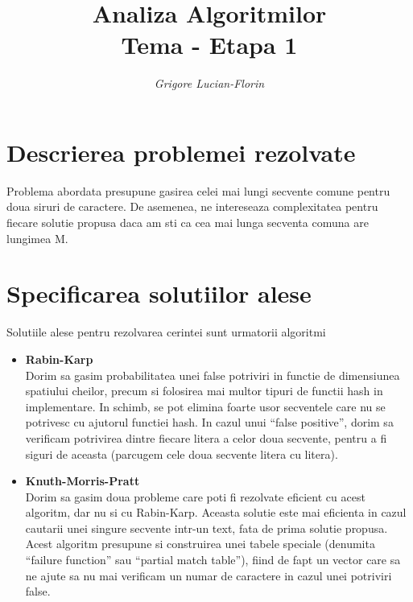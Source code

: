 \documentclass[runningheads]{llncs}
\begin{document}
\title{\huge{Analiza Algoritmilor\\Tema - Etapa 1}}
\author{\textit{\large{Grigore Lucian-Florin}}}

\maketitle
\bigbreak

\section{\Large{Descrierea problemei rezolvate}}
\par Problema abordata presupune gasirea celei mai lungi secvente comune pentru doua siruri de caractere. De asemenea, ne intereseaza complexitatea pentru fiecare solutie propusa daca am sti ca cea mai lunga secventa comuna are lungimea M.


\bigbreak
\section{\Large{Specificarea solutiilor alese}}
\par Solutiile alese pentru rezolvarea cerintei sunt urmatorii algoritmi
\begin{itemize}
	\item \textbf{Rabin-Karp} \\
	Dorim sa gasim probabilitatea unei false potriviri in functie de dimensiunea spatiului 	cheilor, precum si folosirea mai multor tipuri de functii hash in implementare. In schimb, se pot elimina foarte usor secventele care nu se potrivesc cu ajutorul functiei hash. In cazul unui “false positive”, dorim sa verificam potrivirea dintre fiecare litera a celor doua secvente, pentru a fi siguri de aceasta (parcugem cele doua secvente litera cu litera). \\
		\item \textbf{Knuth-Morris-Pratt} \\
		Dorim sa gasim doua probleme care poti fi rezolvate eficient cu acest algoritm, dar nu si cu Rabin-Karp. Aceasta solutie este mai eficienta in cazul cautarii unei singure secvente intr-un text, fata de prima solutie propusa. Acest algoritm presupune si construirea unei tabele speciale (denumita “failure function” sau “partial match table”), fiind de fapt un vector care sa ne ajute sa nu mai verificam un numar de caractere in cazul unei potriviri false.
\end{itemize} 
 
\end{document}
